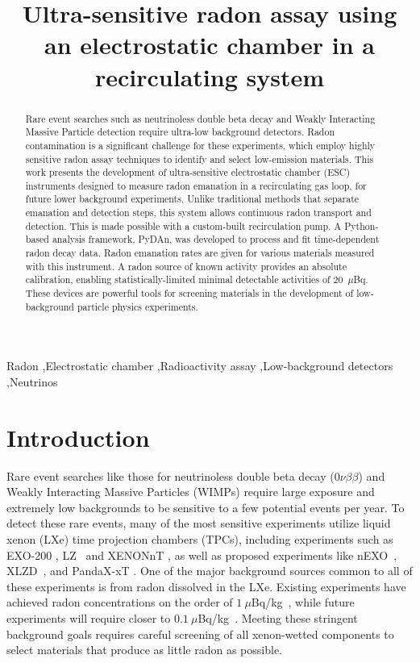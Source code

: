 \documentclass[final,3p,times]{elsarticle}
\begin{document}
\begin{frontmatter}

\title{Ultra-sensitive radon assay using an electrostatic chamber in a recirculating system}



\begin{abstract} 
Rare event searches such as neutrinoless double beta decay and Weakly Interacting Massive Particle detection require ultra-low background detectors. Radon contamination is a significant challenge for these experiments, which employ highly sensitive radon assay techniques to identify and select low-emission materials. This work presents the development of ultra-sensitive electrostatic chamber (ESC) instruments designed to measure radon emanation in a recirculating gas loop, for future lower background experiments. Unlike traditional methods that separate emanation and detection steps, this system allows continuous radon transport and detection. This is made possible with a custom-built recirculation pump. A Python-based analysis framework, PyDAn, was developed to process and fit time-dependent radon decay data. Radon emanation rates are given for various materials measured with this instrument. A radon source of known activity provides an absolute calibration, enabling statistically-limited minimal detectable activities of 20~$\mu$Bq. These devices are powerful tools for screening materials in the development of low-background particle physics experiments.
\end{abstract}

\begin{keyword}
Radon \sep Electrostatic chamber \sep Radioactivity assay  \sep Low-background detectors \sep Neutrinos
\end{keyword}
\end{frontmatter}


\section{Introduction}
Rare event searches like those for neutrinoless double beta decay ($0\nu\beta\beta$) and Weakly Interacting Massive Particles (WIMPs) require large exposure and extremely low backgrounds to be sensitive to a few potential events per year. 
To detect these rare events, many of the most sensitive experiments utilize liquid xenon (LXe) time projection chambers (TPCs), including experiments such as EXO-200 \cite{Auger2012}, LZ~\cite{LZ_general} and XENONnT \cite{XENONnT_general}, as well as proposed experiments like nEXO~\cite{nEXO_PCDR}, XLZD~\cite{XLZD_0bb}, and PandaX-xT \cite{Abdukerim2024}.
One of the major background sources common to all of these experiments is from radon dissolved in the LXe. 
Existing experiments have achieved radon concentrations on the order of $1~\mu$Bq/kg~\cite{xenonnt_rn,LZ_Rn,Albert2015}, while future experiments will require closer to $0.1~\mu$Bq/kg~\cite{XLZD_Rn,nEXO_Rn,PandaX-xT_Rn}. 
Meeting these stringent background goals requires careful screening of all xenon-wetted components to select materials that produce as little radon as possible.
\end{document}
